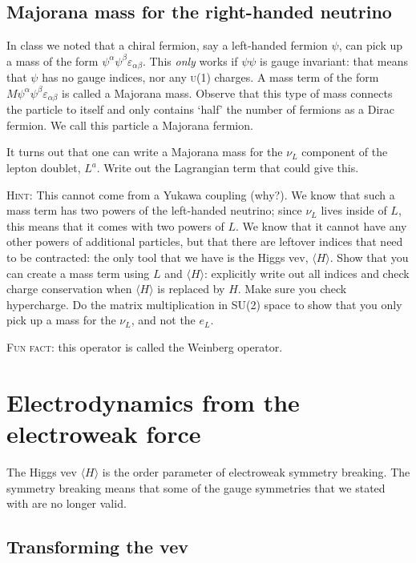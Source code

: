 \documentclass[12pt]{article}
\newcommand{\acro}[1]{\textsc{\MakeLowercase{#1}}}
\numberwithin{equation}{section}    %
\begin{document}
\subsection{Majorana mass for the right-handed neutrino}

In class we noted that a chiral fermion, say a left-handed fermion $\psi$, can pick up a mass of the form $\psi^\alpha\psi^\beta\varepsilon_{\alpha\beta}$. This \emph{only} works if $\psi\psi$ is gauge invariant: that means that $\psi$ has no gauge indices, nor any \acro{U(1)} charges. A mass term of the form $M\psi^\alpha\psi^\beta\varepsilon_{\alpha\beta}$ is called a Majorana mass. Observe that this type of mass connects the particle to itself and only contains `half' the number of fermions as a Dirac fermion. We call this particle a Majorana fermion.

It turns out that one can write a Majorana mass for the $\nu_L$ component of the lepton doublet, $L^a$. Write out the Lagrangian term that could give this.

\textsc{Hint}: This cannot come from a Yukawa coupling (why?). We know that such a mass term has two powers of the left-handed neutrino; since $\nu_L$ lives inside of $L$, this means that it comes with two powers of $L$. We know that it cannot have any other powers of additional particles, but that there are leftover indices that need to be contracted: the only tool that we have is the Higgs vev, $\langle H \rangle$. Show that you can create a mass term using $L$ and $\langle H \rangle$: explicitly write out all indices and check charge conservation when $\langle H \rangle$ is replaced by $H$. Make sure you check hypercharge. Do the matrix multiplication in SU(2) space to show that you only pick up a mass for the $\nu_L$, and not the $e_L$. 

\textsc{Fun fact}: this operator is called the Weinberg operator.



\section{Electrodynamics from the electroweak force}

The Higgs vev $\langle H \rangle$ is the order parameter of electroweak symmetry breaking. The symmetry breaking means that some of the gauge symmetries that we stated with are no longer valid. 

\subsection{Transforming the vev}
\end{document}

